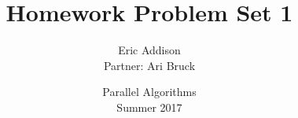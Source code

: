 \documentclass{article}
\title{Homework Problem Set 1}
\author{Eric Addison\\
		Partner: Ari Bruck}
\date{Parallel Algorithms\\Summer 2017}
\begin{document}
\maketitle




\pagebreak

\pagebreak

\end{document}
